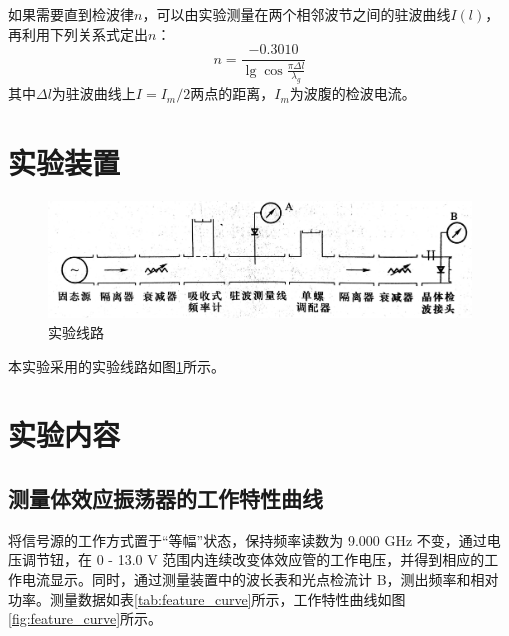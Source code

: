 \documentclass[aps,pre,12pt,preprint,onecolumn,showpacs,showkeys]{revtex4-1}
\begin{document}
        如果需要直到检波律$n$，可以由实验测量在两个相邻波节之间的驻波曲线$I(l)$，再利用下列关系式定出$n$：
        \begin{equation}
            n=\frac{-0.3010}{\lg \cos\frac{\pi \Delta l}{\lambda _g}}\label{eq:n}
        \end{equation}
        其中$\Delta l$为驻波曲线上$I=I_m/2$两点的距离，$I_m$为波腹的检波电流。

\section{实验装置}
\begin{figure}[ht]
    \centering
    \includegraphics[width=120mm]{equip}
    \caption{\label{fig:equip}%
    实验线路}
\end{figure}

本实验采用的实验线路如图\ref{fig:equip}所示。

\section{实验内容}
    \subsection{测量体效应振荡器的工作特性曲线}
    将信号源的工作方式置于“等幅”状态，保持频率读数为 9.000 GHz 不变，通过电压调节钮，在 0 - 13.0 V 范围内连续改变体效应管的工作电压，并得到相应的工作电流显示。同时，通过测量装置中的波长表和光点检流计 B，测出频率和相对功率。测量数据如表\ref{tab:feature_curve}所示，工作特性曲线如图\ref{fig:feature_curve}所示。
\end{document}
